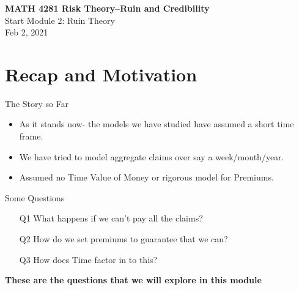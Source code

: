 \documentclass[11pt]{beamer}
\begin{document}
\begin{frame}
  \frametitle{}
  \begin{center}
    \textbf{\large MATH 4281 Risk Theory--Ruin and Credibility}\\
    \vspace{1cm}
    {\large  Start Module 2: Ruin Theory} \\
    \vspace{1cm}
    {\large  Feb 2, 2021}
    \end{center}
    \vspace{1cm}
\end{frame}
\begin{frame}
\tableofcontents
\end{frame}
\section{Recap and Motivation}
\begin{frame}{The Story so Far}

\begin{itemize}

\item As it stands now- the models we have studied have assumed a \alert{short time frame}.

\vfill

\item We have tried to model aggregate claims over say a week/month/year. 

\vfill

\item Assumed no \alert{Time Value of Money} or rigorous model for  \alert{Premiums}. 

\end{itemize}

\end{frame}
\begin{frame}{Some Questions} 

\begin{itemize}

\item[Q1] What happens if we can't pay all the claims?

\vfill

\item[Q2] How do we set premiums to guarantee that we can?

\vfill

\item[Q3] How does \alert{Time} factor in to this?

\end{itemize}
\vfill
\begin{center}
\textbf{These are the questions that we will explore in this module}
\end{center}

\end{frame}
\end{document}
